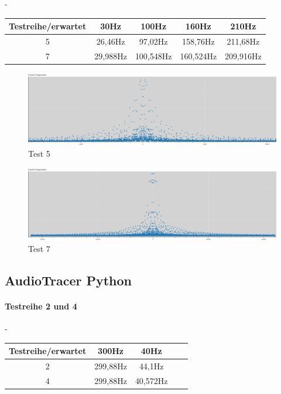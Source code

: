 -
\begin{table}[hbt]
	\centering
	\begin{tabular}{|c | c | c | c | c |}		
		\hline
		Testreihe/erwartet & 30Hz & 100Hz & 160Hz & 210Hz\\
		\hline\hline
		5		&	26,46Hz & 97,02Hz & 158,76Hz & 211,68Hz \\
		7		&	29,988Hz & 100,548Hz & 160,524Hz & 209,916Hz \\
		\hline	
	\end{tabular}	
\end{table}

\begin{figure}[hbt]
	\centering      
	\includegraphics[scale=0.34]{results/test5.png}
	\caption{Test 5}
	\label{fig:test5}
\end{figure}

\begin{figure}[hbt]
	\centering      
	\includegraphics[scale=0.34]{results/test7.png}
	\caption{Test 7}
	\label{fig:test7}
\end{figure}

\newpage
\subsection{AudioTracer Python}

\paragraph{Testreihe 2 und 4}
-

\begin{table}[h!]
	\centering
	\begin{tabular}{|c | c | c | c | c |}		
		\hline
		Testreihe/erwartet & 300Hz & 40Hz \\
		\hline\hline
		2		&	299,88Hz & 44,1Hz \\
		4		&	299,88Hz & 40,572Hz	\\
		\hline	
	\end{tabular}	
\end{table}

